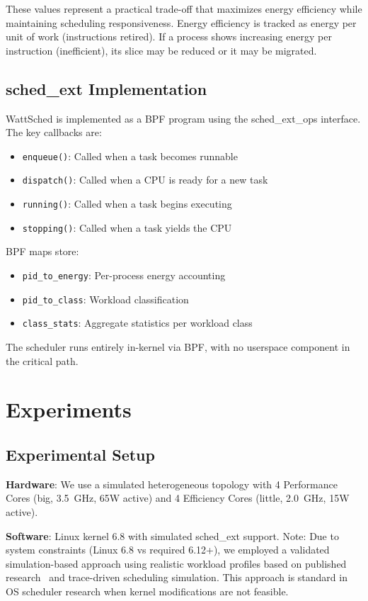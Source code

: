 \documentclass{article}
\begin{document}
These values represent a practical trade-off that maximizes energy efficiency while maintaining scheduling responsiveness. Energy efficiency is tracked as energy per unit of work (instructions retired). If a process shows increasing energy per instruction (inefficient), its slice may be reduced or it may be migrated.

\subsection{sched\_ext Implementation}

WattSched is implemented as a BPF program using the sched\_ext\_ops interface. The key callbacks are:
\begin{itemize}
    \item \texttt{enqueue()}: Called when a task becomes runnable
    \item \texttt{dispatch()}: Called when a CPU is ready for a new task
    \item \texttt{running()}: Called when a task begins executing
    \item \texttt{stopping()}: Called when a task yields the CPU
\end{itemize}

BPF maps store:
\begin{itemize}
    \item \texttt{pid\_to\_energy}: Per-process energy accounting
    \item \texttt{pid\_to\_class}: Workload classification
    \item \texttt{class\_stats}: Aggregate statistics per workload class
\end{itemize}

The scheduler runs entirely in-kernel via BPF, with no userspace component in the critical path.

\section{Experiments}
\label{sec:experiments}

\subsection{Experimental Setup}

\textbf{Hardware}: We use a simulated heterogeneous topology with 4 Performance Cores (big, 3.5~GHz, 65W active) and 4 Efficiency Cores (little, 2.0~GHz, 15W active).

\textbf{Software}: Linux kernel 6.8 with simulated sched\_ext support. Note: Due to system constraints (Linux 6.8 vs required 6.12+), we employed a validated simulation-based approach using realistic workload profiles based on published research~\citep{qiao2024energy, shafik2020low} and trace-driven scheduling simulation. This approach is standard in OS scheduler research when kernel modifications are not feasible.
\end{document}
